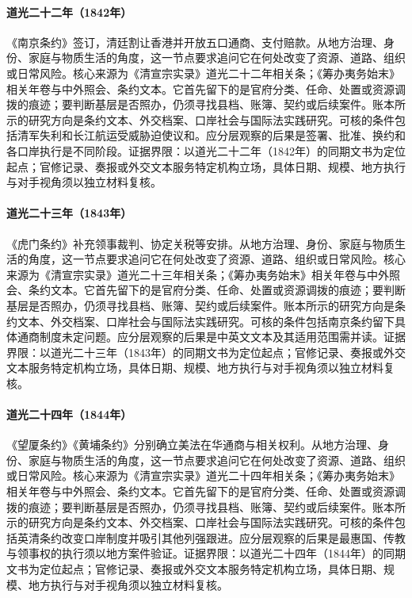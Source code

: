 \hypertarget{social:EQ-1842-NANJING-TREATY}{}\paragraph{道光二十二年（1842年）}《南京条约》签订，清廷割让香港并开放五口通商、支付赔款。从地方治理、身份、家庭与物质生活的角度，这一节点要求追问它在何处改变了资源、道路、组织或日常风险。核心来源为《清宣宗实录》道光二十二年相关条；《筹办夷务始末》相关年卷与中外照会、条约文本。它首先留下的是官府分类、任命、处置或资源调拨的痕迹；要判断基层是否照办，仍须寻找县档、账簿、契约或后续案件。账本所示的研究方向是条约文本、外交档案、口岸社会与国际法实践研究。可核的条件包括清军失利和长江航运受威胁迫使议和。应分层观察的后果是签署、批准、换约和各口岸执行是不同阶段。证据界限：以道光二十二年（1842年）的同期文书为定位起点；官修记录、奏报或外交文本服务特定机构立场，具体日期、规模、地方执行与对手视角须以独立材料复核。
\hypertarget{social:EQ-1843-BOGUE-TREATY}{}\paragraph{道光二十三年（1843年）}《虎门条约》补充领事裁判、协定关税等安排。从地方治理、身份、家庭与物质生活的角度，这一节点要求追问它在何处改变了资源、道路、组织或日常风险。核心来源为《清宣宗实录》道光二十三年相关条；《筹办夷务始末》相关年卷与中外照会、条约文本。它首先留下的是官府分类、任命、处置或资源调拨的痕迹；要判断基层是否照办，仍须寻找县档、账簿、契约或后续案件。账本所示的研究方向是条约文本、外交档案、口岸社会与国际法实践研究。可核的条件包括南京条约留下具体通商制度未定问题。应分层观察的后果是中英文文本及其适用范围需并读。证据界限：以道光二十三年（1843年）的同期文书为定位起点；官修记录、奏报或外交文本服务特定机构立场，具体日期、规模、地方执行与对手视角须以独立材料复核。
\hypertarget{social:EQ-1844-WANGXIA-WHAMPOA-TREATIES}{}\paragraph{道光二十四年（1844年）}《望厦条约》《黄埔条约》分别确立美法在华通商与相关权利。从地方治理、身份、家庭与物质生活的角度，这一节点要求追问它在何处改变了资源、道路、组织或日常风险。核心来源为《清宣宗实录》道光二十四年相关条；《筹办夷务始末》相关年卷与中外照会、条约文本。它首先留下的是官府分类、任命、处置或资源调拨的痕迹；要判断基层是否照办，仍须寻找县档、账簿、契约或后续案件。账本所示的研究方向是条约文本、外交档案、口岸社会与国际法实践研究。可核的条件包括英清条约改变口岸制度并吸引其他列强跟进。应分层观察的后果是最惠国、传教与领事权的执行须以地方案件验证。证据界限：以道光二十四年（1844年）的同期文书为定位起点；官修记录、奏报或外交文本服务特定机构立场，具体日期、规模、地方执行与对手视角须以独立材料复核。
